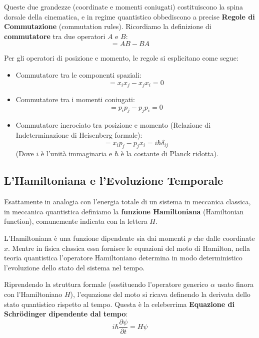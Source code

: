 Queste due grandezze (coordinate e momenti coniugati) costituiscono la spina dorsale della cinematica, e in regime quantistico obbediscono a precise \textbf{Regole di Commutazione} (commutation rules). Ricordiamo la definizione di \textbf{commutatore} tra due operatori $A$ e $B$:
\begin{equation}
[A, B] = AB - BA
\end{equation}

Per gli operatori di posizione e momento, le regole si esplicitano come segue:
\begin{itemize}
\item Commutatore tra le componenti spaziali:
\begin{equation}
[x_i, x_j] = x_i x_j - x_j x_i = 0
\end{equation}
\item Commutatore tra i momenti coniugati:
\begin{equation}
[p_i, p_j] = p_i p_j - p_j p_i = 0
\end{equation}
\item Commutatore incrociato tra posizione e momento (Relazione di Indeterminazione di Heisenberg formale):
\begin{equation}
[x_i, p_j] = x_i p_j - p_j x_i = i \hbar \delta_{ij}
\end{equation}
(Dove $i$ è l'unità immaginaria e $\hbar$ è la costante di Planck ridotta).
\end{itemize}

\subsection{L'Hamiltoniana e l'Evoluzione Temporale}

Esattamente in analogia con l'energia totale di un sistema in meccanica classica, in meccanica quantistica definiamo la \textbf{funzione Hamiltoniana} (Hamiltonian function), comunemente indicata con la lettera $H$.

L'Hamiltoniana è una funzione dipendente sia dai momenti $p$ che dalle coordinate $x$. Mentre in fisica classica essa fornisce le equazioni del moto di Hamilton, nella teoria quantistica l'operatore Hamiltoniano determina in modo deterministico l'evoluzione dello stato del sistema nel tempo.

Riprendendo la struttura formale (sostituendo l'operatore generico $\alpha$ usato finora con l'Hamiltoniano $H$), l'equazione del moto si ricava definendo la derivata dello stato quantistico rispetto al tempo. Questa è la celeberrima \textbf{Equazione di Schrödinger dipendente dal tempo}:
\begin{equation}
i \hbar \frac{\partial \psi}{\partial t} = H \psi
\end{equation}

